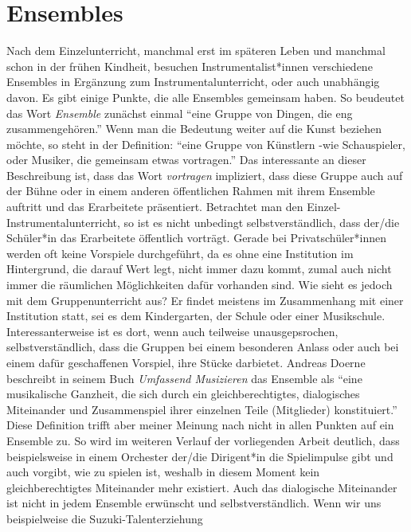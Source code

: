 \section{Ensembles}

Nach dem Einzelunterricht, manchmal erst im späteren Leben und manchmal schon in
der frühen Kindheit, besuchen Instrumentalist*innen verschiedene Ensembles in
Ergänzung zum Instrumentalunterricht, oder auch unabhängig davon. Es gibt einige
Punkte, die alle Ensembles gemeinsam haben. So beudeutet das Wort
\emph{Ensemble} zunächst einmal \enquote{eine Gruppe von Dingen, die eng
zusammengehören.}\autocite{wikipedia:gruppe} Wenn man die Bedeutung weiter auf
die Kunst beziehen möchte, so steht in der Definition: \enquote{eine Gruppe von
Künstlern -wie Schauspieler, oder Musiker, die gemeinsam etwas vortragen.}
\autocite{wikipedia:gruppe} Das interessante an dieser Beschreibung ist, dass
das Wort \emph{vortragen} impliziert, dass diese Gruppe auch auf der Bühne oder
in einem anderen öffentlichen Rahmen mit ihrem Ensemble auftritt und das
Erarbeitete präsentiert. Betrachtet man den Einzel- Instrumentalunterricht, so
ist es nicht unbedingt selbstverständlich, dass der/die Schüler*in das
Erarbeitete öffentlich vorträgt. Gerade bei Privatschüler*innen werden oft keine
Vorspiele durchgeführt, da es ohne eine Institution im Hintergrund, die darauf
Wert legt, nicht immer dazu kommt, zumal auch nicht immer die räumlichen
Möglichkeiten dafür vorhanden sind. Wie sieht es jedoch mit dem
Gruppenunterricht aus? Er findet meistens im Zusammenhang mit einer
Institution statt, sei es dem Kindergarten, der Schule oder einer Musikschule.
Interessanterweise ist es dort, wenn auch teilweise unausgepsrochen,
selbstverständlich, dass die Gruppen bei einem besonderen Anlass oder auch bei
einem dafür geschaffenen Vorspiel, ihre Stücke darbietet. Andreas Doerne
beschreibt in seinem Buch \emph{Umfassend Musizieren} das Ensemble als
\enquote{eine musikalische Ganzheit, die sich durch ein gleichberechtigtes,
dialogisches Miteinander und Zusammenspiel ihrer einzelnen Teile (Mitglieder)
konstituiert.} \autocite[62]{doerne:umfassend_musizieren} Diese Definition
trifft aber meiner Meinung nach nicht in allen Punkten auf ein Ensemble zu. So
wird im weiteren Verlauf der vorliegenden Arbeit deutlich, dass beispielsweise in einem Orchester der/die
Dirigent*in die Spielimpulse gibt und auch vorgibt, wie zu spielen ist,
weshalb in diesem Moment kein gleichberechtigtes Miteinander mehr existiert. Auch
das dialogische Miteinander ist nicht in jedem Ensemble erwünscht und
selbstverständlich. Wenn wir uns beispielweise die Suzuki-Talenterziehung
